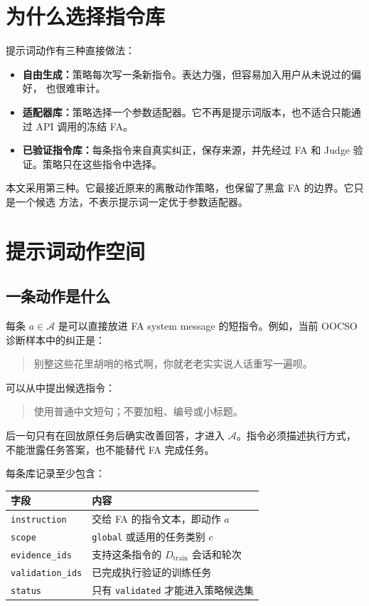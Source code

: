 \documentclass[11pt,UTF8,fontset=fandol]{ctexart}
\newcommand{\Dtrain}{D_{\mathrm{train}}}
\begin{document}
\section{为什么选择指令库}

提示词动作有三种直接做法：
\begin{itemize}
  \item \textbf{自由生成：}策略每次写一条新指令。表达力强，但容易加入用户从未说过的偏好，
    也很难审计。
  \item \textbf{适配器库：}策略选择一个参数适配器。它不再是提示词版本，也不适合只能通过
    API 调用的冻结 FA。
  \item \textbf{已验证指令库：}每条指令来自真实纠正，保存来源，并先经过 FA 和 Judge
    验证。策略只在这些指令中选择。
\end{itemize}

本文采用第三种。它最接近原来的离散动作策略，也保留了黑盒 FA 的边界。它只是一个候选
方法，不表示提示词一定优于参数适配器。

\section{提示词动作空间}

\subsection{一条动作是什么}

每条 \(a\in\mathcal A\) 是可以直接放进 FA system message 的短指令。例如，当前
OOCSO 诊断样本中的纠正是：
\begin{quote}
别整这些花里胡哨的格式啊，你就老老实实说人话重写一遍呗。
\end{quote}
可以从中提出候选指令：
\begin{quote}
使用普通中文短句；不要加粗、编号或小标题。
\end{quote}
后一句只有在回放原任务后确实改善回答，才进入 \(\mathcal A\)。指令必须描述执行方式，
不能泄露任务答案，也不能替代 FA 完成任务。

每条库记录至少包含：
\begin{center}
\small
\begin{tabularx}{0.94\textwidth}{@{}L{0.23\textwidth}Y@{}}
  \toprule
  字段 & 内容 \\
  \midrule
  \texttt{instruction} & 交给 FA 的指令文本，即动作 \(a\) \\
  \texttt{scope} & \texttt{global} 或适用的任务类别 \(c\) \\
  \texttt{evidence\_ids} & 支持这条指令的 \(\Dtrain\) 会话和轮次 \\
  \texttt{validation\_ids} & 已完成执行验证的训练任务 \\
  \texttt{status} & 只有 \texttt{validated} 才能进入策略候选集 \\
  \bottomrule
\end{tabularx}
\end{center}
\end{document}
